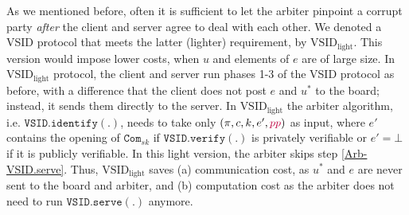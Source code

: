 


\begin{remark}\label{remark::light-VSID}
As we mentioned before, often it is sufficient  to let the arbiter pinpoint a corrupt party \emph{after} the client and server agree to deal with each other. We denoted a VSID protocol that meets the latter (lighter) requirement, by $\text{VSID}_{\scriptscriptstyle \text{light}}$. This  version would impose lower costs, when $u$ and elements of $e$ are of large size. In  $\text{VSID}_{\scriptscriptstyle \text{light}}$ protocol, the client and server  run phases 1-3 of the VSID protocol as before, with a difference that the client does not post $e$ and $u^{\scriptscriptstyle*}$ to the board; instead, it sends them directly to the server. In $\text{VSID}_{\scriptscriptstyle\text{light}}$  the arbiter algorithm, i.e. $\mathtt{VSID.identify}(.)$, needs to take only $(\pi,c,k,e',{\color{purple}pp})$ as input, where $e'$ contains the opening of $\mathtt{Com}_{\scriptscriptstyle {sk}}$ if $\mathtt{VSID.verify}(.)$ is privately verifiable or $e'=\bot$ if  it is publicly verifiable. In this light version, the arbiter   skips step \ref{Arb-VSID.serve}. Thus, $\text{VSID}_{\scriptscriptstyle\text{light}}$ saves (a)  communication cost, as   $u^{\scriptscriptstyle*}$ and $e$ are never sent to the board and  arbiter, and (b) computation  cost as the arbiter does not need to run $\mathtt{VSID.serve}(.)$ anymore. 
\end{remark}











